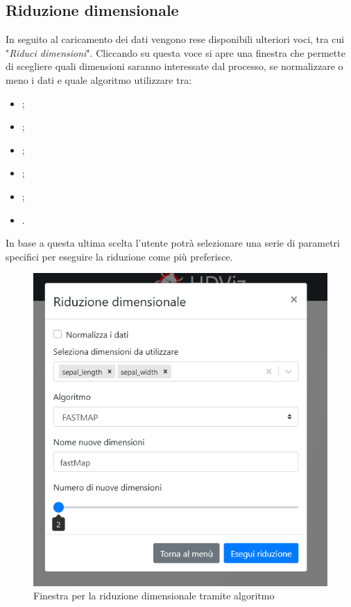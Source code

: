 
\newpage
\subsection{Riduzione dimensionale} 
In seguito al caricamento dei dati vengono rese disponibili ulteriori voci, tra cui "\textit{Riduci dimensioni}". Cliccando su questa voce si apre una finestra che permette di scegliere quali dimensioni saranno interessate dal processo, se normalizzare o meno i dati e quale algoritmo utilizzare tra:

\begin{itemize}
	\item {};
	\item {};
	\item {};
	\item {};
	\item {};
	\item {}.
\end{itemize}

In base a questa ultima scelta l'utente potrà selezionare una serie di parametri specifici per eseguire la riduzione come più preferisce.

\begin{figure}[H]
		\includegraphics[scale=0.65]{Images/RiduzioneDimensionale.png}
		\centering
		\caption{Finestra per la riduzione dimensionale tramite algoritmo}
\end{figure}

